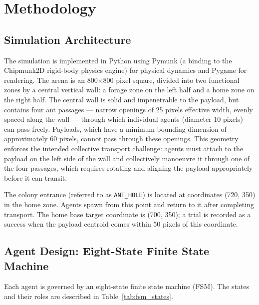 \chapter{Methodology}
\label{ch:methodology}

\section{Simulation Architecture}
\label{sec:sim_architecture}

The simulation is implemented in Python using Pymunk (a binding to the Chipmunk2D rigid-body physics engine) for physical dynamics and Pygame for rendering. The arena is an 800$\times$800 pixel square, divided into two functional zones by a central vertical wall: a forage zone on the left half and a home zone on the right half. The central wall is solid and impenetrable to the payload, but contains four ant passages — narrow openings of 25 pixels effective width, evenly spaced along the wall — through which individual agents (diameter 10 pixels) can pass freely. Payloads, which have a minimum bounding dimension of approximately 60 pixels, cannot pass through these openings. This geometry enforces the intended collective transport challenge: agents must attach to the payload on the left side of the wall and collectively manoeuvre it through one of the four passages, which requires rotating and aligning the payload appropriately before it can transit.

The colony entrance (referred to as \texttt{ANT\_HOLE}) is located at coordinates (720, 350) in the home zone. Agents spawn from this point and return to it after completing transport. The home base target coordinate is (700, 350); a trial is recorded as a success when the payload centroid comes within 50 pixels of this coordinate.

\section{Agent Design: Eight-State Finite State Machine}
\label{sec:fsm}

Each agent is governed by an eight-state finite state machine (FSM). The states and their roles are described in Table~\ref{tab:fsm_states}.

